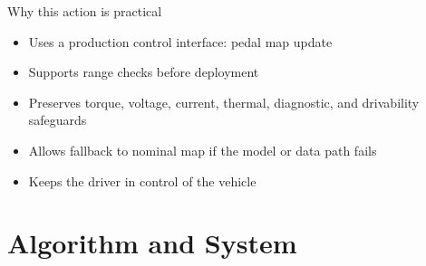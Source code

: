 \documentclass[aspectratio=169,professionalfonts]{beamer}
\begin{document}
\begin{frame}[label={sec:orgbac3a03}]{Why this action is practical}
\begin{itemize}
\item Uses a production control interface: pedal map update
\item Supports range checks before deployment
\item Preserves torque, voltage, current, thermal, diagnostic, and
drivability safeguards
\item Allows fallback to nominal map if the model or data path fails
\item Keeps the driver in control of the vehicle
\end{itemize}
\end{frame}
\section*{Algorithm and System}
\label{sec:orgfa2b07b}
\end{document}
